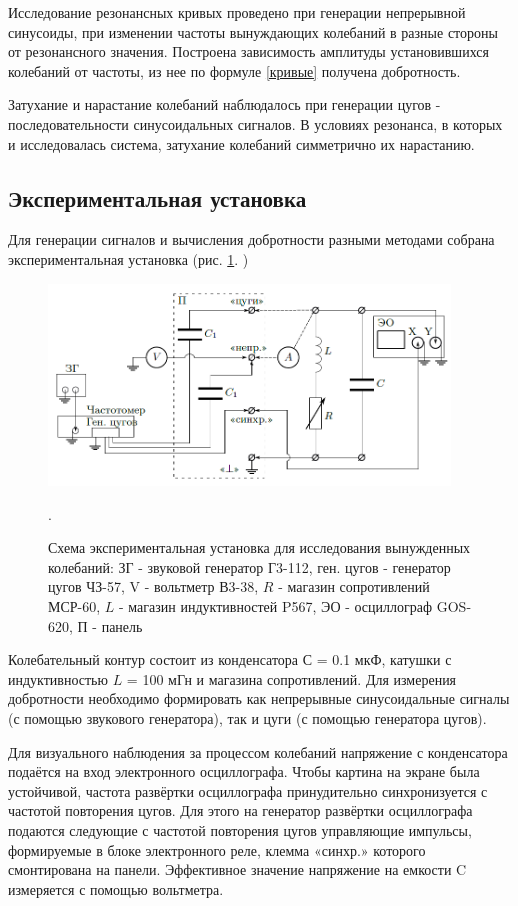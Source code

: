 \documentclass[a4paper,12pt]{article} %
\begin{document}
Исследование резонансных кривых проведено при генерации непрерывной синусоиды, при изменении частоты вынуждающих колебаний в разные стороны от резонансного значения. Построена зависимость амплитуды установившихся колебаний от частоты, из нее по формуле \ref{кривые} получена добротность.

Затухание и нарастание колебаний наблюдалось при генерации цугов - последовательности синусоидальных сигналов. В условиях резонанса, в которых и исследовалась система, затухание колебаний симметрично их нарастанию.


\subsection*{Экспериментальная установка}

Для генерации сигналов и вычисления добротности разными методами собрана экспериментальная установка (рис.  \ref{установка}. )
\begin{figure}[h!]
\begin{center}
\includegraphics[width=0.95\textwidth]{установка}
\caption{Схема экспериментальная установка для исследования вынужденных
колебаний: ЗГ - звуковой генератор Г3-112, ген. цугов - генератор цугов ЧЗ-57, V - вольтметр В3-38, $R$ - магазин сопротивлений МСР-60, $L$ - магазин индуктивностей P567, ЭО - осциллограф GOS-620, П - панель} \label{установка}.
\end{center}
\end{figure} 

Колебательный контур состоит из конденсатора $С $ = 0.1 мкФ, катушки с индуктивностью $L$ = 100 мГн и магазина сопротивлений. Для измерения добротности необходимо формировать как непрерывные синусоидальные сигналы (с помощью звукового генератора), так и цуги (с помощью генератора цугов). 

Для визуального наблюдения за процессом колебаний напряжение с конденсатора подаётся на вход электронного осциллографа. Чтобы картина на экране была устойчивой, частота развёртки осциллографа принудительно синхронизуется с частотой повторения цугов. Для этого на генератор развёртки осциллографа подаются следующие с частотой повторения цугов управляющие импульсы, формируемые в блоке электронного реле, клемма «синхр.» которого смонтирована на панели. Эффективное значение напряжение на емкости C измеряется с помощью вольтметра.
\end{document}
